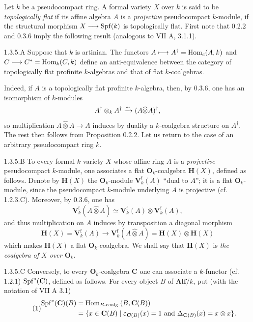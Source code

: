 Let $k$ be a pseudocompact ring. A formal variety $X$ over $k$ is said to be \emph{topologically flat} if its affine algebra $A$ is a \emph{projective} pseudocompact $k$-module, \ie if the structural morphism $X\longrightarrow\operatorname{Spf}(k)$ is topologically flat.
First note that 0.2.2 and 0.3.6 imply the following result (analogous to VII A, 3.1.1).
\begin{lemma}{1.3.5.A}\label{VIIB.1.3.5.A}
Suppose that $k$ is artinian. The functors $A\longmapsto A^\dagger=\operatorname{Hom}_c(A,k)$ and $C\longmapsto C^*=\operatorname{Hom}_k(C,k)$ define an anti-equivalence between the category of topologically flat profinite $k$-algebras and that of flat $k$-coalgebras.
\end{lemma}
Indeed, if $A$ is a topologically flat profinite $k$-algebra, then, by 0.3.6, one has an isomorphism of $k$-modules
\[
A^\dagger\otimes_k A^\dagger\xrightarrow{\sim}(A\widehat\otimes A)^\dagger,
\]
so multiplication $A\widehat\otimes A\to A$ induces by duality a $k$-coalgebra structure on $A^\dagger$. The rest then follows from Proposition 0.2.2.
Let us return to the case of an arbitrary pseudocompact ring $k$.
\begin{definition}{1.3.5.B}\label{VIIB.1.3.5.B}
To every formal $k$-variety $X$ whose affine ring $A$ is a \emph{projective} pseudocompact $k$-module, one associates a flat $\mathbf O_k$-coalgebra $\mathbf H(X)$, defined as follows.
Denote by $\mathbf H(X)$ the $\mathbf O_k$-module $\mathbf V_k^{\mathrm f}(A)$ ``dual to $A$''; it is a flat $\mathbf O_k$-module, since the pseudocompact $k$-module underlying $A$ is projective (cf. 1.2.3.C). Moreover, by 0.3.6, one has
\[
\mathbf V_k^{\mathrm f}(A\widehat\otimes A)\simeq\mathbf V_k^{\mathrm f}(A)\otimes\mathbf V_k^{\mathrm f}(A),
\]
and thus multiplication on $A$ induces by transposition a diagonal morphism
\[
\mathbf H(X)=\mathbf V_k^{\mathrm f}(A)\to\mathbf V_k^{\mathrm f}(A\widehat\otimes A)=\mathbf H(X)\otimes\mathbf H(X)
\]
which makes $\mathbf H(X)$ a flat $\mathbf O_k$-coalgebra. We shall say that $\mathbf H(X)$ is \emph{the coalgebra of $X$ over $\mathbf O_k$}.
\end{definition}
\begin{definition}{1.3.5.C}\label{VIIB.1.3.5.C}
Conversely, to every $\mathbf O_k$-coalgebra $\mathbf C$ one can associate a $k$-functor (cf. 1.2.1) $\operatorname{Spf}^*(\mathbf C)$, defined as follows. For every object $B$ of $\mathbf{Alf}/k$, put (with the notation of VII A 3.1)
\begin{equation}\tag{1}
\begin{aligned}
\operatorname{Spf}^*(\mathbf C)(B)&=\operatorname{Hom}_{B\text{-}\mathrm{coalg.}}(B,\mathbf C(B))\\
&=\{x\in\mathbf C(B)\mid\varepsilon_{\mathbf C(B)}(x)=1\ \text{and }\Delta_{\mathbf C(B)}(x)=x\otimes x\}.
\end{aligned}
\end{equation}
\end{definition}
